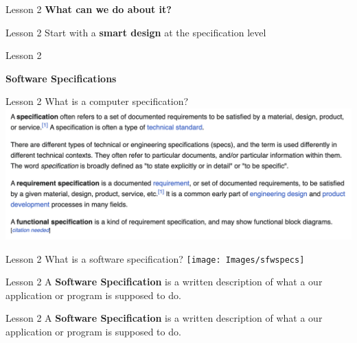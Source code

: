 \documentclass[aspectratio=1610]{beamer}
\begin{document}
\begin{frame}
\end{frame}

\begin{frame}{Lesson 2}{}
\Huge
\center
    \textbf{What can we do about it?} 
\end{frame}



\begin{frame}{Lesson 2}{}
\Huge
\center
   Start with a \textbf{smart design} at the specification level
\end{frame}


\begin{frame}{Lesson 2}{}
\begin{center}
\Huge\textbf{Software Specifications}
\end{center}
\end{frame}


\begin{frame}{Lesson 2}{}
\Huge{What is a computer specification?}
\includegraphics[scale=0.52]{Images/specs}
\end{frame}


\begin{frame}{Lesson 2}{}
\Huge{What is a software specification?}
\texttt{[image: Images/sfwspecs]}
\end{frame}


\begin{frame}{Lesson 2}{}
\Huge
    A \textbf{Software Specification} is a 
    \alert{written} description of what a our application or program 
    is supposed to do.
\end{frame}




\begin{frame}{Lesson 2}{}
\Huge
    A \textbf{Software Specification} is a
    \alert{written} description of what a our application or program
    is supposed to do.
\end{frame}
\end{document}
